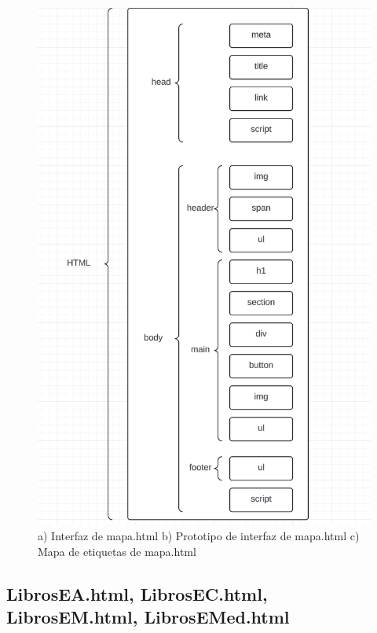 \documentclass{article}
\begin{document}
\begin{figure}[H]
\begin{minipage}{0.49\textwidth}
    \end{minipage}
    
    \vspace{5mm}
    
    \includegraphics[width=\textwidth, height=0.4\textheight, keepaspectratio]{htmlFotos/MEAH.jpg}
    \caption{a) Interfaz de mapa.html b) Prototipo de interfaz de mapa.html c) Mapa de etiquetas de mapa.html}
    \label{fig:imagenes_conjuntas}
\end{figure}

\subsection*{LibrosEA.html, LibrosEC.html, LibrosEM.html, LibrosEMed.html}
\end{document}
